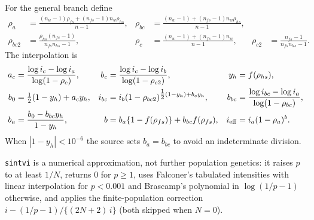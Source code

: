 \documentclass[11pt]{article}
\newcommand{\src}[1]{\texttt{#1}}
\begin{document}
For the general branch define
\begin{align}\label{eq:rawrho}
\rho_a&=\frac{(n_w-1)\rho_{fs}+(n_{fs}-1)n_w\rho_{hs}}{n-1},&
\rho_{bc}&=\frac{(n_w-1)+(n_{fs}-1)n_w\rho_{hs}}{n-1},\\
\rho_{bc2}&=\frac{\rho_{hs}(n_{fs}-1)}{n_{fs}n_{hs}-1},&
\rho_c&=\frac{(n_w-1)+(n_{fs}-1)n_w}{n-1},&
\rho_{c2}&=\frac{n_{fs}-1}{n_{fs}n_{hs}-1}.\nonumber
\end{align}
The interpolation is
\begin{align}\label{eq:rawinterp}
a_c&=\frac{\log i_c-\log i_a}{\log(1-\rho_c)},&
b_c&=\frac{\log i_c-\log i_b}{\log(1-\rho_{c2})},&
y_h&=f(\rho_{hs}),\\
b_0&=\tfrac12(1-y_h)+a_cy_h,&
i_{bc}&=i_b(1-\rho_{bc2})^{\tfrac12(1-y_h)+b_cy_h},&
b_{bc}&=\frac{\log i_{bc}-\log i_a}{\log(1-\rho_{bc})},\nonumber\\
b_a&=\frac{b_0-b_{bc}y_h}{1-y_h},&
b&=b_a\{1-f(\rho_{fs})\}+b_{bc}f(\rho_{fs}),&
i_{\rm eff}&=i_a(1-\rho_a)^b.\nonumber
\end{align}
When $|1-y_h|<10^{-6}$ the source sets $b_a=b_{bc}$ to avoid an indeterminate division.

\src{sintvi} is a numerical approximation, not further population genetics: it raises $p$ to at least $1/N$, returns 0 for $p\ge1$, uses Falconer's tabulated intensities with linear interpolation for $p<0.001$ and Brascamp's polynomial in $\log(1/p-1)$ otherwise, and applies the finite-population correction $i-(1/p-1)/\{(2N+2)\,i\}$ (both skipped when $N=0$).
\end{document}

